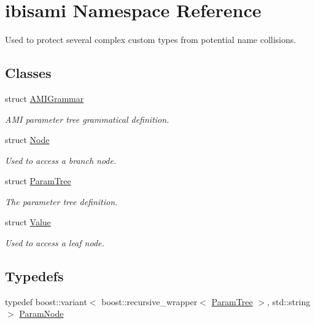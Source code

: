 \hypertarget{namespaceibisami}{}\section{ibisami Namespace Reference}
\label{namespaceibisami}


Used to protect several complex custom types from potential name collisions.  


\subsection*{Classes}
\begin{DoxyCompactItemize}
\item 
struct \hyperlink{structibisami_1_1_a_m_i_grammar}{A\+M\+I\+Grammar}
\begin{DoxyCompactList}\small\item\em A\+M\+I parameter tree grammatical definition. \end{DoxyCompactList}\item 
struct \hyperlink{structibisami_1_1_node}{Node}
\begin{DoxyCompactList}\small\item\em Used to access a {\itshape branch} node. \end{DoxyCompactList}\item 
struct \hyperlink{structibisami_1_1_param_tree}{Param\+Tree}
\begin{DoxyCompactList}\small\item\em The parameter tree definition. \end{DoxyCompactList}\item 
struct \hyperlink{structibisami_1_1_value}{Value}
\begin{DoxyCompactList}\small\item\em Used to access a {\itshape leaf} node. \end{DoxyCompactList}\end{DoxyCompactItemize}
\subsection*{Typedefs}
\begin{DoxyCompactItemize}
\item 
typedef boost\+::variant$<$ boost\+::recursive\+\_\+wrapper$<$ \hyperlink{structibisami_1_1_param_tree}{Param\+Tree} $>$, std\+::string $>$ \hyperlink{namespaceibisami_a56481565abb44593a678738f57c04109}{Param\+Node}
\end{DoxyCompactItemize}


